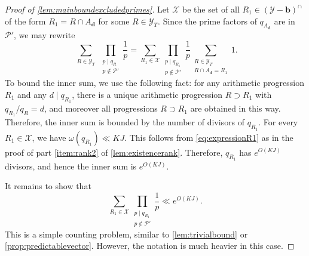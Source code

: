 \documentclass[11pt]{amsart}
\theoremstyle{definition}
\newcommand{\primes}{\mathcal{P}}
\renewcommand{\d}{\boldsymbol{d}}
\newcommand{\sommespart}{b}
\newcommand{\progression}{A_{\d}}
\renewcommand{\vec}{\boldsymbol}
\newcommand{\prohibprog}{\mathcal{Y}}
\newcommand{\modulus}{q}
\newcommand{\repR}{J}
\newcommand{\repK}{K}
\newcommand{\sofprog}{\mathcal{Y}_{\ncond}}
\newcommand{\shiftedprog}{\prohibprog-\vec{\sommespart}}
\newcommand{\interprog}{(\shiftedprog)^{\cap}}
\newcommand{\ncond}{T}
\newcommand{\sset}{\primes'}
\begin{document}
\begin{proof}[Proof of \cref{lem:mainboundexcludedprimes}]
Let $\mathcal{X}$ be the set of all $R_1\in \interprog$ of the form $R_1 = R\cap \progression$ for some $R\in \sofprog$. Since the prime factors of $\modulus_{\progression}$ are in $\sset$, we may rewrite
\begin{equation*}
	\sum_{\substack{R\in \sofprog}} \prod_{\substack{p\mid \modulus_{R}\\ p\not\in \sset }}\frac{1}{p} = \sum_{R_1\in \mathcal{X}}  \prod_{\substack{p\mid \modulus_{R_1}\\ p\not\in \sset}}\frac{1}{p} \sum_{\substack{R\in \sofprog\\ R\cap \progression = R_1}} 1.
\end{equation*}
To bound the inner sum, we use the following fact: for any arithmetic progression $R_1$ and any $d\mid \modulus_{R_1}$, there is a unique arithmetic progression $R\supset R_1$ with $\modulus_{R_1}/\modulus_{R} = d$, and moreover all progressions $R\supset R_1$ are obtained in this way. Therefore, the inner sum is bounded by the number of divisors of $\modulus_{R_1}$. For every $R_1\in \mathcal{X}$, we have ${\omega(\modulus_{R_1}) \ll \repK\repR}$. This follows from \cref{eq:expressionR1} as in the proof of part \cref{item:rank2} of \cref{lem:existencerank}. Therefore, $\modulus_{R_1}$ has $e^{O(\repK\repR)}$ divisors, and hence the inner sum is $e^{O(\repK\repR)}$.

It remains to show that 
\begin{equation}
\label{eq:partrank4}
	\sum_{R_1\in \mathcal{X}}  \prod_{\substack{p\mid \modulus_{R_1}\\ p\not\in \sset}}\frac{1}{p} \ll e^{O(\repK\repR)}.
\end{equation}
This is a simple counting problem, similar to \cref{lem:trivialbound} or \cref{prop:predictablevector}. However, the notation is much heavier in this case.


\end{proof}
\end{document}
